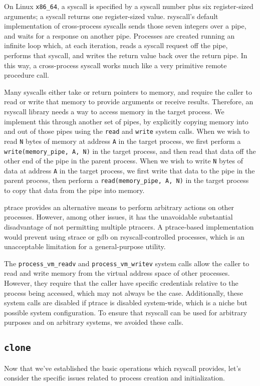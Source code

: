 \documentclass{acmart}
\begin{document}
On Linux \verb|x86_64|, a syscall is specified by a syscall number plus six register-sized arguments;
a syscall returns one register-sized value.
rsyscall's default implementation of cross-process syscalls sends those seven integers over a pipe,
and waits for a response on another pipe.
Processes are created running an infinite loop which, at each iteration,
reads a syscall request off the pipe,
performs that syscall,
and writes the return value back over the return pipe.
In this way, a cross-process syscall works much like a very primitive remote procedure call.

Many syscalls either take or return pointers to memory,
and require the caller to read or write that memory to provide arguments or receive results.
Therefore, an rsyscall library needs a way to access memory in the target process.
We implement this through another set of pipes,
by explicitly copying memory into and out of those pipes using the \texttt{read} and \texttt{write} system calls.
When we wish to read \texttt{N} bytes of memory at address \texttt{A} in the target process,
we first perform a \verb|write(memory_pipe, A, N)| in the target process,
and then read that data off the other end of the pipe in the parent process.
When we wish to write \texttt{N} bytes of data at address \texttt{A} in the target process,
we first write that data to the pipe in the parent process,
then perform a \verb|read(memory_pipe, A, N)| in the target process to copy that data from the pipe into memory.

ptrace provides an alternative means to perform arbitrary actions on other processes.
However, among other issues, it has the unavoidable substantial disadvantage of not permitting multiple ptracers.
A ptrace-based implementation would prevent using strace or gdb on rsyscall-controlled processes,
which is an unacceptable limitation for a general-purpose utility.

The \verb|process_vm_readv| and \verb|process_vm_writev| system calls
allow the caller to read and write memory from the virtual address space of other processes.
However, they require that the caller have specific credentials relative to the process being accessed,
which may not always be the case.
Additionally, these system calls are disabled if ptrace is disabled system-wide,
which is a niche but possible system configuration.
To ensure that rsyscall can be used for arbitrary purposes and on arbitrary systems, we avoided these calls.
\subsection{\texttt{clone}}\label{clone}
Now that we've established the basic operations which rsyscall provides,
let's consider the specific issues related to process creation and initialization.
\end{document}
